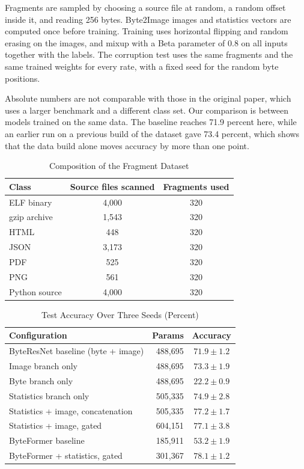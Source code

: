 \documentclass[journal]{IEEEtran}
\begin{document}
Fragments are sampled by choosing a source file at random, a random offset inside it, and reading 256 bytes. Byte2Image images and statistics vectors are computed once before training. Training uses horizontal flipping and random erasing on the images, and mixup with a Beta parameter of 0.8 on all inputs together with the labels. The corruption test uses the same fragments and the same trained weights for every rate, with a fixed seed for the random byte positions.

Absolute numbers are not comparable with those in the original paper, which uses a larger benchmark and a different class set. Our comparison is between models trained on the same data. The baseline reaches 71.9 percent here, while an earlier run on a previous build of the dataset gave 73.4 percent, which shows that the data build alone moves accuracy by more than one point.

\begin{table}[t]
\caption{Composition of the Fragment Dataset}
\label{tab:data}
\centering
\begin{tabular}{lcc}
\hline
Class & Source files scanned & Fragments used \\
\hline
ELF binary & 4,000 & 320 \\
gzip archive & 1,543 & 320 \\
HTML & 448 & 320 \\
JSON & 3,173 & 320 \\
PDF & 525 & 320 \\
PNG & 561 & 320 \\
Python source & 4,000 & 320 \\
\hline
\end{tabular}
\end{table}

\begin{table}[t]
\caption{Test Accuracy Over Three Seeds (Percent)}
\label{tab:main}
\centering
\begin{tabular}{lrc}
\hline
Configuration & Params & Accuracy \\
\hline
ByteResNet baseline (byte + image) & 488,695 & $71.9\pm1.2$ \\
Image branch only & 488,695 & $73.3\pm1.9$ \\
Byte branch only & 488,695 & $22.2\pm0.9$ \\
Statistics branch only & 505,335 & $74.9\pm2.8$ \\
Statistics + image, concatenation & 505,335 & $\mathbf{77.2\pm1.7}$ \\
Statistics + image, gated & 604,151 & $77.1\pm3.8$ \\
\hline
ByteFormer baseline & 185,911 & $53.2\pm1.9$ \\
ByteFormer + statistics, gated & 301,367 & $\mathbf{78.1\pm1.2}$ \\
\hline
\end{tabular}
\end{table}
\end{document}
